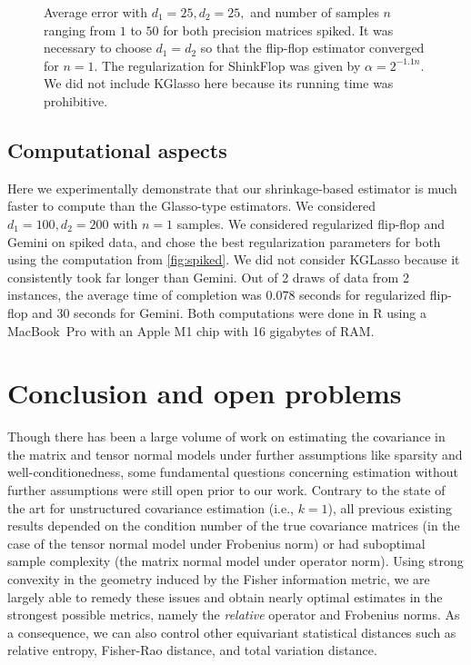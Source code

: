 \documentclass[aos]{imsart}
\theoremstyle{definition}
\numberwithin{equation}{section}
\begin{document}
\begin{figure}
\begin{subfigure}[b]{.4\textwidth}
         \end{subfigure}
\caption{Average error with $d_1 = 25, d_2 = 25, $ and number of samples $n$ ranging from $1$ to $50$ for both precision matrices spiked. It was necessary to choose $d_1 = d_2$ so that the flip-flop estimator converged for $n = 1$. The regularization for ShinkFlop was given by $\alpha = 2^{-1.1n}$. We did not include KGlasso here because its running time was prohibitive.\label{fig:lc}}
\end{figure}

\subsection{Computational aspects}
Here we experimentally demonstrate that our shrinkage-based estimator is much faster to compute than the Glasso-type estimators. We considered $d_1 =100, d_2 = 200$ with $n = 1$ samples. We considered regularized flip-flop and Gemini on spiked data, and chose the best regularization parameters for both using the computation from \cref{fig:spiked}. We did not consider KGLasso because it consistently took far longer than Gemini. Out of 2 draws of data from 2 instances, the average time of completion was 0.078 seconds for regularized flip-flop and 30 seconds for Gemini. Both computations were done in R using a MacBook~Pro with an Apple M1 chip with 16 gigabytes of RAM.

\section{Conclusion and open problems}
Though there has been a large volume of work on estimating the covariance in the matrix and tensor normal models under further assumptions like sparsity and well-conditionedness, some fundamental questions concerning estimation without further assumptions were still open prior to our work.
Contrary to the state of the art for unstructured covariance estimation (i.e., $k = 1$), all previous existing results depended on the condition number of the true covariance matrices (in the case of the tensor normal model under Frobenius norm) or had suboptimal sample complexity (the matrix normal model under operator norm).
Using strong convexity in the geometry induced by the Fisher information metric, we are largely able to remedy these issues and obtain nearly optimal estimates in the strongest possible metrics, namely the \emph{relative} operator and Frobenius norms.
As a consequence, we can also control other equivariant statistical distances such as relative entropy, Fisher-Rao distance, and total variation distance.
\end{document}
